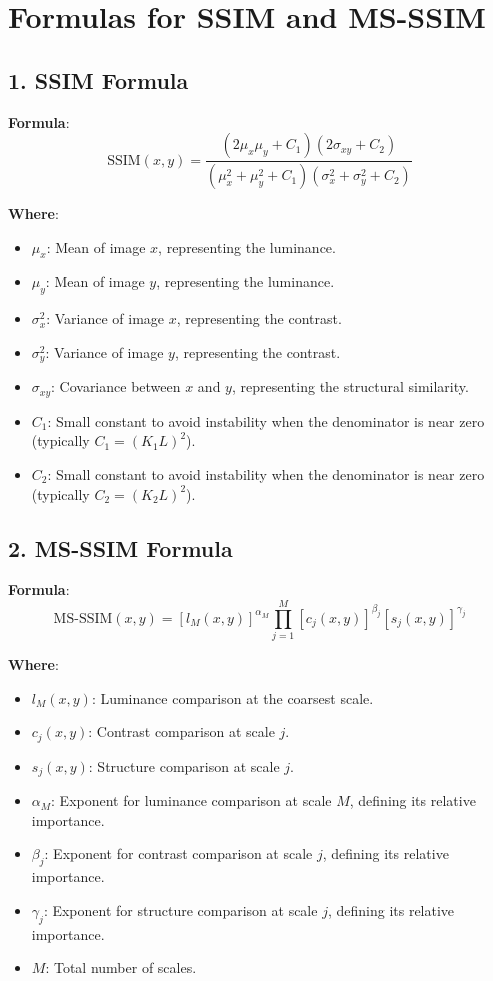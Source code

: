 \documentclass{article}
\begin{document}
\section*{Formulas for SSIM and MS-SSIM}

\subsection*{1. SSIM Formula}

\textbf{Formula}: 
\begin{equation}
\text{SSIM}(x, y) = \frac{(2\mu_x \mu_y + C_1)(2\sigma_{xy} + C_2)}{(\mu_x^2 + \mu_y^2 + C_1)(\sigma_x^2 + \sigma_y^2 + C_2)}
\end{equation}

\textbf{Where}:
\begin{itemize}
    \item $\mu_x$: Mean of image $x$, representing the luminance.
    \item $\mu_y$: Mean of image $y$, representing the luminance.
    \item $\sigma_x^2$: Variance of image $x$, representing the contrast.
    \item $\sigma_y^2$: Variance of image $y$, representing the contrast.
    \item $\sigma_{xy}$: Covariance between $x$ and $y$, representing the structural similarity.
    \item $C_1$: Small constant to avoid instability when the denominator is near zero (typically $C_1 = (K_1 L)^2$).
    \item $C_2$: Small constant to avoid instability when the denominator is near zero (typically $C_2 = (K_2 L)^2$).
\end{itemize}

\subsection*{2. MS-SSIM Formula}

\textbf{Formula}: 
\begin{equation}
\text{MS-SSIM}(x, y) = [l_M(x, y)]^{\alpha_M} \prod_{j=1}^{M} [c_j(x, y)]^{\beta_j} [s_j(x, y)]^{\gamma_j}
\end{equation}

\textbf{Where}:
\begin{itemize}
    \item $l_M(x, y)$: Luminance comparison at the coarsest scale.
    \item $c_j(x, y)$: Contrast comparison at scale $j$.
    \item $s_j(x, y)$: Structure comparison at scale $j$.
    \item $\alpha_M$: Exponent for luminance comparison at scale $M$, defining its relative importance.
    \item $\beta_j$: Exponent for contrast comparison at scale $j$, defining its relative importance.
    \item $\gamma_j$: Exponent for structure comparison at scale $j$, defining its relative importance.
    \item $M$: Total number of scales.
\end{itemize}
\end{document}
